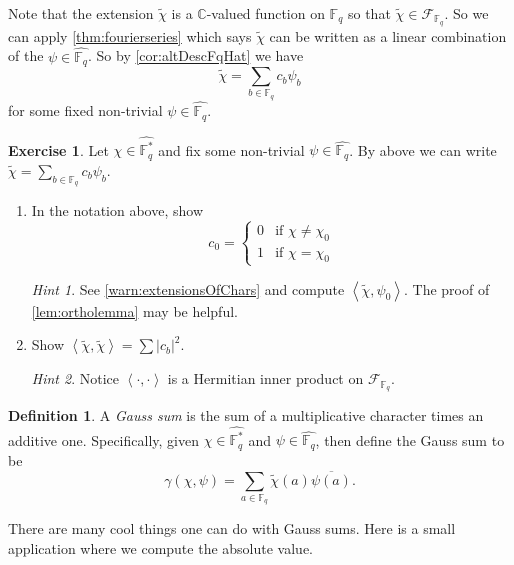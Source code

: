 \documentclass[11pt]{article}
\newcommand{\BB}[1]{\mathbb{#1}} %
\newcommand{\script}[1]{\mathcal{#1}} %
\newcommand{\free}[1]{\left\langle#1\right\rangle} %
\newcommand{\CC}{\BB{C}}
\newcommand{\FF}{\BB{F}}
\newcommand{\sF}{\script{F}}
\renewcommand{\hat}{\widehat}
\theoremstyle{plain}
\theoremstyle{definition}
\newtheorem{defn}[definitionCounter]{Definition}
\newtheorem{excer}[exerciseCounter]{Exercise}
\theoremstyle{remark}
\newtheorem*{hint}{Hint}
\begin{document}
Note that the extension $\widetilde{\chi}$ is a $\CC$-valued function on $\FF_q$ so that $\widetilde{\chi}\in\sF_{\FF_q}$. So we can apply \autoref{thm:fourierseries} which says $\widetilde{\chi}$ can be written as a linear combination of the $\psi\in\hat{\FF_q}$. So by \autoref{cor:altDescFqHat} we have
$$
\widetilde{\chi} = \sum_{b\in\FF_q}c_b\psi_b
$$
for some fixed non-trivial $\psi\in\hat{\FF_q}$.

\begin{excer}\label{ex:c_0ForChi}
	Let $\chi\in\widehat{\FF_q^*}$ and fix some non-trivial $\psi\in\widehat{\FF_q}$. By above we can write $\widetilde{\chi} = \sum_{b\in\FF_q}c_b\psi_b$.
	\begin{enumerate}[label=(\alph*)]
		\item
		In the notation above, show
		$$
			c_0 =
			\begin{cases}
				0 &\text{if $\chi\neq\chi_0$}
				\\
				1 &\text{if $\chi = \chi_0$}
			\end{cases}
		$$
		\begin{hint}
			See \autoref{warn:extensionsOfChars} and compute $\free{\widetilde{\chi},\psi_0}$. The proof of \autoref{lem:ortholemma} may be helpful.
		\end{hint}

		\item
		Show $\free{\widetilde{\chi},\widetilde{\chi}} = \sum |c_b|^2$.
		\begin{hint}
			Notice $\free{\cdot,\cdot}$ is a Hermitian inner product on $\sF_{\FF_q}$.
		\end{hint}
	\end{enumerate}
\end{excer}

\begin{defn}
	A \emph{Gauss sum} is the sum of a multiplicative character times an additive one. Specifically, given $\chi\in\hat{\FF_q^*}$ and $\psi\in\hat{\FF_q}$, then define the Gauss sum to be
	$$
	\gamma(\chi,\psi) = \sum_{a\in\FF_q}\widetilde{\chi}(a)\overline{\psi(a)}.
	$$
\end{defn}

There are many cool things one can do with Gauss sums. Here is a small application where we compute the absolute value.
\end{document}
